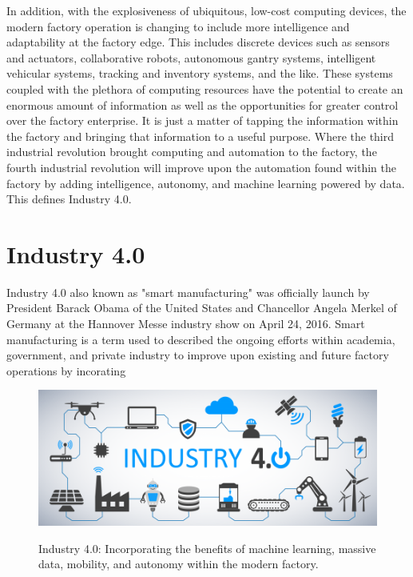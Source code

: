 In addition, with the explosiveness of ubiquitous, low-cost computing devices, the modern factory operation is changing to include more intelligence and adaptability at the factory edge.  This includes discrete devices such as sensors and actuators, collaborative robots, autonomous gantry systems, intelligent vehicular systems, tracking and inventory systems, and the like.  These systems coupled with the plethora of computing resources have the potential to create an enormous amount of information as well as the opportunities for greater control over the factory enterprise.  It is just a matter of tapping the information within the factory and bringing that information to a useful purpose.  Where the third industrial revolution brought computing and automation to the factory, the fourth industrial revolution will improve upon the automation found within the factory by adding intelligence, autonomy, and machine learning powered by data. This defines Industry 4.0.  

\section{Industry 4.0}

Industry 4.0 also known as "smart manufacturing" was officially launch by President Barack Obama of the United States and Chancellor Angela Merkel of Germany at the Hannover Messe industry show on April 24, 2016\textcolor{red}{\cite{INTROSAMPLE}}.  Smart manufacturing is a term used to described the ongoing efforts within academia, government, and private industry to improve upon existing and future factory operations by incorating

\begin{figure}[!tbp]
	\begin{center}
		\includegraphics[width=\textwidth]{./chapter-intro/images/intro/forbes-i40.png}
		\label{fig:intro:forbes-i40}
		\caption{Industry 4.0: Incorporating the benefits of machine learning, massive data, mobility, and autonomy within the modern factory.  }
	\end{center}
\end{figure}

